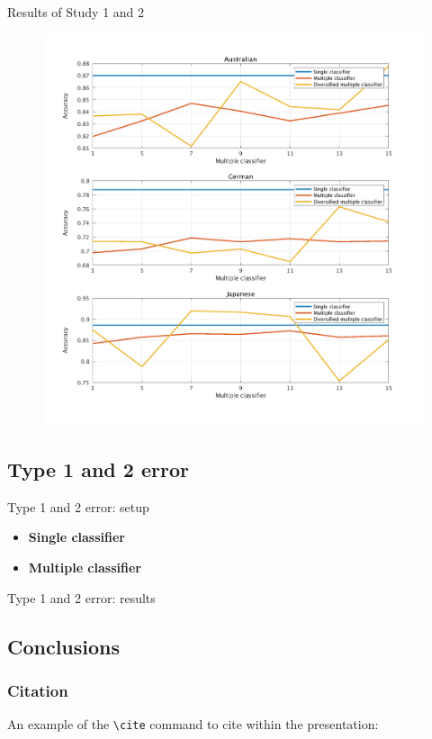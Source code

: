 \documentclass[12pt]{beamer}
\begin{document}
\begin{frame}{Results of Study 1 and 2}
    \begin{figure}
    \includegraphics[width=0.6\linewidth]{../../data/graph.png}
    \end{figure}
\end{frame}

\subsection{Type 1 and 2 error}
\begin{frame}{Type 1 and 2 error: setup}
\begin{itemize}
  \item \textbf{Single classifier}
  \item \textbf{Multiple classifier}
\end{itemize}
\end{frame}

\begin{frame}{Type 1 and 2 error: results}
  
\end{frame}

\subsection{Conclusions}




\begin{frame}[fragile] %
    \frametitle{Citation}
    An example of the \verb|\cite| command to cite within the presentation:\\~

\end{frame}
\end{document}
